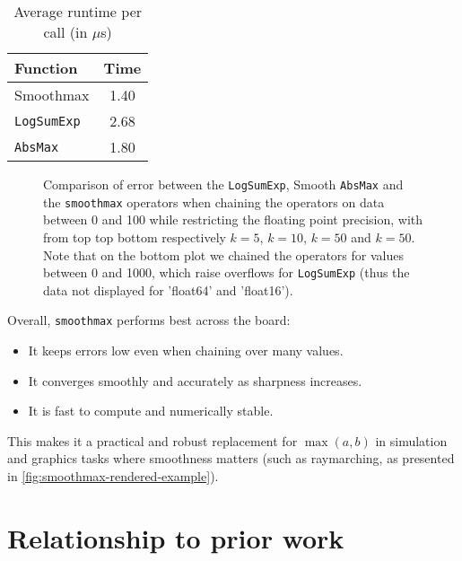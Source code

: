 \begin{table}[H]
    \centering
    \begin{tabular}{l|c}
        \toprule
        Function & Time \\
        \midrule
        Smoothmax & 1.40 \\
        \texttt{LogSumExp} & 2.68 \\
        \texttt{AbsMax}    & 1.80 \\
        \bottomrule
    \end{tabular}
    \caption{Average runtime per call (in $\mu$s)}
    \label{tab:smoothmax-time}
\end{table}

\begin{figure}
    \caption{Comparison of error between the \texttt{LogSumExp}, Smooth \texttt{AbsMax} and the \texttt{smoothmax} operators when chaining the operators on data between 0 and 100 while restricting the floating point precision, with from top top bottom respectively $k=5$, $k=10$, $k=50$ and $k=50$. Note that on the bottom plot we chained the operators for values between 0 and 1000, which raise overflows for \texttt{LogSumExp} (thus the data not displayed for 'float64' and 'float16'). }
    \label{fig:smoothmax-precision-per-floating-point}
\end{figure}
\midConclusion

Overall, \texttt{smoothmax} performs best across the board:
\begin{itemize}
    \item It keeps errors low even when chaining over many values.
    \item It converges smoothly and accurately as sharpness increases.
    \item It is fast to compute and numerically stable.
\end{itemize}

This makes it a practical and robust replacement for $\max(a, b)$ in simulation and graphics tasks where smoothness matters (such as raymarching, as presented in \cref{fig:smoothmax-rendered-example}).

\section{Relationship to prior work}

